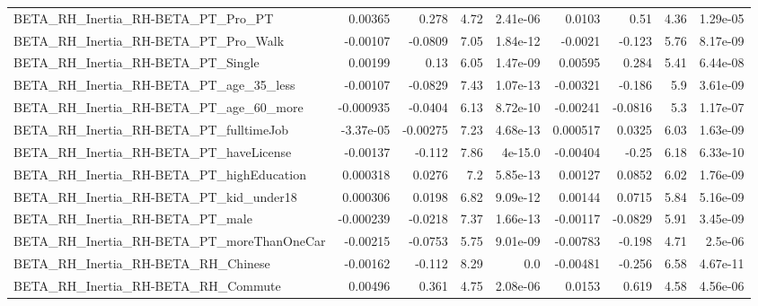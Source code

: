 \begin{tabular}{lrrrrrrrr}
BETA\_RH\_Inertia\_RH-BETA\_PT\_Pro\_PT                  &     0.00365 &        0.278 &     4.72 & 2.41e-06 &     0.0103 &        0.51 &         4.36 &      1.29e-05 \\
BETA\_RH\_Inertia\_RH-BETA\_PT\_Pro\_Walk                &    -0.00107 &      -0.0809 &     7.05 & 1.84e-12 &    -0.0021 &      -0.123 &         5.76 &      8.17e-09 \\
BETA\_RH\_Inertia\_RH-BETA\_PT\_Single                  &     0.00199 &         0.13 &     6.05 & 1.47e-09 &    0.00595 &       0.284 &         5.41 &      6.44e-08 \\
BETA\_RH\_Inertia\_RH-BETA\_PT\_age\_35\_less             &    -0.00107 &      -0.0829 &     7.43 & 1.07e-13 &   -0.00321 &      -0.186 &          5.9 &      3.61e-09 \\
BETA\_RH\_Inertia\_RH-BETA\_PT\_age\_60\_more             &   -0.000935 &      -0.0404 &     6.13 & 8.72e-10 &   -0.00241 &     -0.0816 &          5.3 &      1.17e-07 \\
BETA\_RH\_Inertia\_RH-BETA\_PT\_fulltimeJob             &   -3.37e-05 &     -0.00275 &     7.23 & 4.68e-13 &   0.000517 &      0.0325 &         6.03 &      1.63e-09 \\
BETA\_RH\_Inertia\_RH-BETA\_PT\_haveLicense             &    -0.00137 &       -0.112 &     7.86 &  4e-15.0 &   -0.00404 &       -0.25 &         6.18 &      6.33e-10 \\
BETA\_RH\_Inertia\_RH-BETA\_PT\_highEducation           &    0.000318 &       0.0276 &      7.2 & 5.85e-13 &    0.00127 &      0.0852 &         6.02 &      1.76e-09 \\
BETA\_RH\_Inertia\_RH-BETA\_PT\_kid\_under18             &    0.000306 &       0.0198 &     6.82 & 9.09e-12 &    0.00144 &      0.0715 &         5.84 &      5.16e-09 \\
BETA\_RH\_Inertia\_RH-BETA\_PT\_male                    &   -0.000239 &      -0.0218 &     7.37 & 1.66e-13 &   -0.00117 &     -0.0829 &         5.91 &      3.45e-09 \\
BETA\_RH\_Inertia\_RH-BETA\_PT\_moreThanOneCar          &    -0.00215 &      -0.0753 &     5.75 & 9.01e-09 &   -0.00783 &      -0.198 &         4.71 &       2.5e-06 \\
BETA\_RH\_Inertia\_RH-BETA\_RH\_Chinese                 &    -0.00162 &       -0.112 &     8.29 &      0.0 &   -0.00481 &      -0.256 &         6.58 &      4.67e-11 \\
BETA\_RH\_Inertia\_RH-BETA\_RH\_Commute                 &     0.00496 &        0.361 &     4.75 & 2.08e-06 &     0.0153 &       0.619 &         4.58 &      4.56e-06 \\

\end{tabular}
